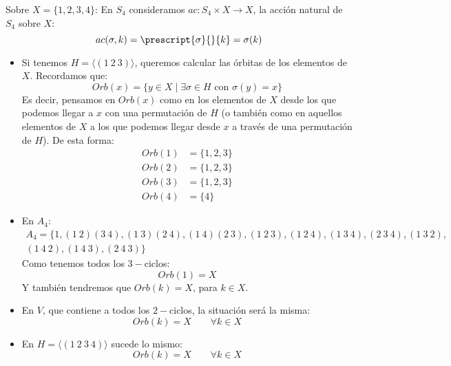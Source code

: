 \begin{ejemplo}
    Sobre $X = \{1,2,3,4\}$:
    En $S_4$ consideramos $ac:S_4\times X\to X$, la acción natural de $S_4$ sobre $X$:
        \begin{equation*}
            ac(\sigma,k) = \prescript{\sigma}{}{k} = \sigma(k)
        \end{equation*}
    \begin{itemize}
        \item Si tenemos $H = \langle (1\ 2\ 3) \rangle $, queremos calcular las órbitas de los elementos de $X$. Recordamos que:
            \begin{equation*}
                Orb(x) = \{y\in X \mid \exists \sigma\in H \text{\ con\ } \sigma(y) = x\}
            \end{equation*}
            Es decir, pensamos en $Orb(x)$ como en los elementos de $X$ desde los que podemos llegar a $x$ con una permutación de $H$ (o también como en aquellos elementos de $X$ a los que podemos llegar desde $x$ a través de una permutación de $H$). De esta forma:
            \begin{align*}
                Orb(1) &= \{1,2,3\} \\
                Orb(2) &= \{1, 2, 3\} \\
                Orb(3) &= \{1, 2, 3\} \\
                Orb(4) &= \{4\}
            \end{align*}
        \item En $A_4$:
            \begin{multline*}
                A_4 = \{1, (1\ 2)(3\ 4), (1\ 3)(2\ 4), (1\ 4)(2\ 3), (1\ 2\ 3), (1\ 2\ 4), (1\ 3\ 4), (2\ 3\ 4), (1\ 3\ 2),\\ (1\ 4\ 2), (1\ 4\ 3), (2\ 4\ 3)\}
            \end{multline*}
            Como tenemos todos los $3-$ciclos:
            \begin{equation*}
                Orb(1) = X
            \end{equation*}
            Y también tendremos que $Orb(k) = X$, para $k\in X$.
        \item En $V$, que contiene a todos los $2-$ciclos, la situación será la misma:
            \begin{equation*}
                Orb(k) = X \qquad \forall k\in X
            \end{equation*}
        \item En $H = \langle (1\ 2\ 3\ 4) \rangle $ sucede lo mismo:
            \begin{equation*}
                Orb(k) = X \qquad \forall k\in X
            \end{equation*}
    \end{itemize}
\end{ejemplo}

